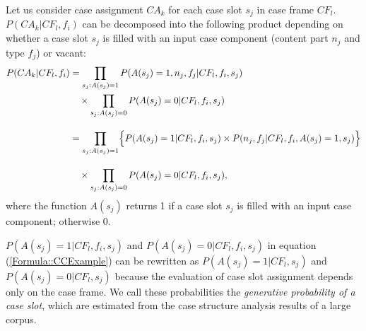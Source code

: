 \documentclass[english]{jnlp_1.4_rep}
\begin{document}
Let us consider case assignment $CA_k$ for each case slot $s_j$ in case
frame $CF_l$. $P(CA_k|CF_l,f_i)$ can be decomposed into the following
product depending on whether a case slot $s_j$ is filled with an input
case component (content part $n_j$ and type $f_j$) or vacant:
{\allowdisplaybreaks
\begin{align}
 P(CA_k|CF_l,f_i) & = \prod_{s_j: A(s_j)=1} P(A(s_j)=1,n_j,f_j|CF_l,f_i,s_j) \nonumber\\
 & \quad \times \prod_{s_j: A(s_j)=0} P(A(s_j)=0|CF_l,f_i,s_j) \nonumber\\[10pt]
 & = \prod_{s_j: A(s_j)=1} \Bigl\{ P(A(s_j)=1|CF_l,f_i,s_j) 
	\times P(n_j,f_j|CF_l,f_i,A(s_j)=1,s_j)\Bigl\} \nonumber\\[10pt]
 & \quad \times \prod_{s_j: A(s_j)=0} P(A(s_j)=0|CF_l,f_i,s_j),
\label{Formula::CCExample}
\end{align}
}
where the function $A(s_j)$ returns 1 if a case slot $s_j$ is filled
with an input case component; otherwise 0.

$P(A(s_j)=1|CF_l,f_i,s_j)$ and $P(A(s_j)=0|CF_l,f_i,s_j)$
in equation (\ref{Formula::CCExample}) can be rewritten as
$P(A(s_j)=1|CF_l,s_j)$ and $P(A(s_j)=0|CF_l,s_j)$ because the evaluation
of case slot assignment depends only on the case frame.  We call these
probabilities the \textit{generative probability of a case slot}, which
are estimated from the case structure analysis results of a large corpus.
\end{document}
